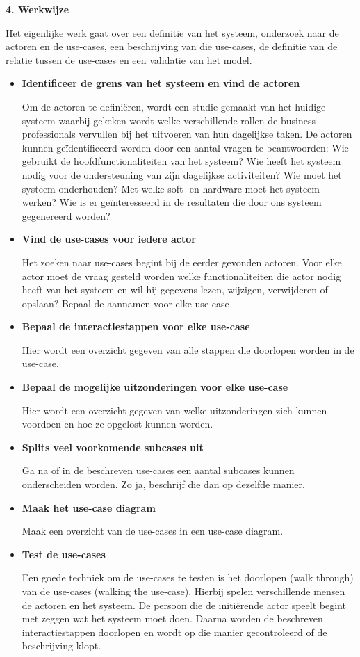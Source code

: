 \textbf{4. Werkwijze}

Het eigenlijke werk gaat over een definitie van het systeem, onderzoek naar de actoren en de use-cases, een beschrijving van die use-cases, de definitie van de relatie tussen de use-cases en een validatie van het model.

\begin{itemize}
\item \textbf{Identificeer de grens van het systeem en vind de actoren}

Om de actoren te definiëren, wordt een studie gemaakt van het huidige systeem waarbij gekeken wordt welke verschillende rollen de business professionals vervullen bij het uitvoeren van hun dagelijkse taken.
De actoren kunnen geïdentificeerd worden door een aantal vragen te beantwoorden: Wie gebruikt de hoofdfunctionaliteiten van het systeem? Wie heeft het systeem nodig voor de ondersteuning van zijn dagelijkse activiteiten? Wie moet het systeem onderhouden? Met welke soft- en hardware moet het systeem werken? Wie is er geïnteresseerd in de resultaten die door ons systeem gegenereerd worden?
\item \textbf{Vind de use-cases voor iedere actor}

Het zoeken naar use-cases begint bij de eerder gevonden actoren. Voor elke actor moet de vraag gesteld worden welke functionaliteiten die actor nodig heeft van het systeem en wil hij gegevens lezen, wijzigen, verwijderen of opslaan?
Bepaal de aannamen voor elke use-case
\item \textbf{Bepaal de interactiestappen voor elke use-case}

Hier wordt een overzicht gegeven van alle stappen die doorlopen worden in de use-case.
\item \textbf{Bepaal de mogelijke uitzonderingen voor elke use-case}

Hier wordt een overzicht gegeven van welke uitzonderingen zich kunnen voordoen en hoe ze opgelost kunnen worden.
\item \textbf{Splits veel voorkomende subcases uit}

Ga na of in de beschreven use-cases een aantal subcases kunnen onderscheiden worden. Zo ja, beschrijf die dan op dezelfde manier.
\item \textbf{Maak het use-case diagram}

Maak een overzicht van de use-cases in een use-case diagram.
\item \textbf{Test de use-cases}

Een goede techniek om de use-cases te testen is het doorlopen (walk through) van de use-cases (walking the use-case). Hierbij spelen verschillende mensen de actoren en het systeem. De persoon die de initiërende actor speelt begint met zeggen wat het systeem moet doen. Daarna worden de beschreven interactiestappen doorlopen en wordt op die manier gecontroleerd of de beschrijving klopt.

\end{itemize}


